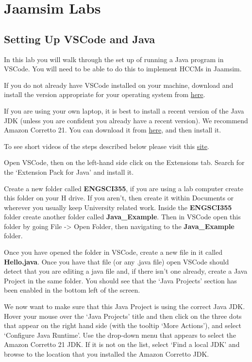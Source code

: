 \documentclass[
  10pt,
  a4paperpaper,
  DIV=11,
  numbers=noendperiod,
  oneside]{scrreprt}
\begin{document}
\part{Jaamsim Labs}

\chapter{Setting Up VSCode and Java}\label{setting-up-vscode-and-java}

In this lab you will walk through the set up of running a Java program
in VSCode. You will need to be able to do this to implement HCCMs in
Jaamsim.

If you do not already have VSCode installed on your machine, download
and install the version appropriate for your operating system from
\href{https://code.visualstudio.com/Download}{here}.

If you are using your own laptop, it is best to install a recent version
of the Java JDK (unless you are confident you already have a recent
version). We recommend Amazon Corretto 21. You can download it from
\href{https://docs.aws.amazon.com/corretto/latest/corretto-21-ug/downloads-list.html}{here},
and then install it.

To see short videos of the steps described below please visit this
\href{https://auckland.au.panopto.com/Panopto/Pages/Sessions/List.aspx?folderID=e07b3856-7cf5-4024-8c93-b21f016633ea}{site}.

Open VSCode, then on the left-hand side click on the Extensions tab.
Search for the `Extension Pack for Java' and install it.

Create a new folder called \textbf{ENGSCI355}, if you are using a lab
computer create this folder on your H drive. If you aren't, then create
it within Documents or wherever you usually keep University related
work. Inside the \textbf{ENGSCI355} folder create another folder called
\textbf{Java\_Example}. Then in VSCode open this folder by going File
-\textgreater{} Open Folder, then navigating to the
\textbf{Java\_Example} folder.

Once you have opened the folder in VSCode, create a new file in it
called \textbf{Hello.java}. Once you have that file (or any .java file)
open VSCode should detect that you are editing a java file and, if there
isn't one already, create a Java Project in the same folder. You should
see that the `Java Projects' section has been enabled in the bottom left
of the screen.

We now want to make sure that this Java Project is using the correct
Java JDK. Hover your mouse over the `Java Projects' title and then click
on the three dots that appear on the right hand side (with the tooltip
`More Actions'), and select `Configure Java Runtime'. Use the drop-down
menu that appears to select the Amazon Corretto 21 JDK. If it is not on
the list, select `Find a local JDK' and browse to the location that you
installed the Amazon Corretto JDK.
\end{document}
